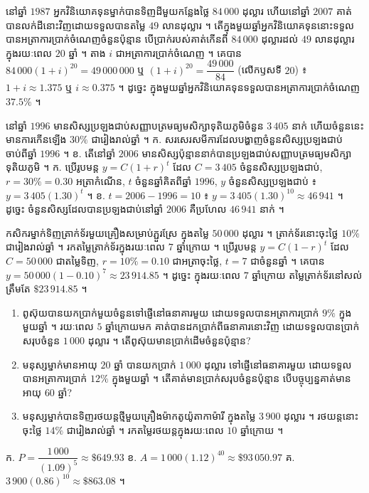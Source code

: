 \begin{example}[លំហាត់គំរូ ១]
នៅឆ្នាំ $1987$ អ្នកវិនិយោគទុនម្នាក់បានទិញដីមួយកន្លែងថ្លៃ $84\,000$ ដុល្លារ ហើយនៅឆ្នាំ $2007$ គាត់បានលក់ដីនោះវិញដោយទទួលបានតម្លៃ $49$ លានដុល្លារ ។ តើក្នុងមួយឆ្នាំអ្នកវិនិយោគទុននោះទទួលបានអត្រាការប្រាក់ចំណេញចំនួនប៉ុន្មាន បើប្រាក់របស់គាត់កើនពី $84\,000$ ដុល្លារដល់ $49$ លានដុល្លារក្នុងរយៈពេល $20$ ឆ្នាំ ។
\ans
តាង $i$ ជាអត្រាការប្រាក់ចំណេញ ។ គេបាន $84\,000(1 + i)^{20} = 49\,000\,000$ ឬ $(1 + i)^{20} = \dfrac{49\,000}{84}$ (លើកឫសទី $20$) ៖ $1 + i \approx 1.375$ ឬ $i \approx 0.375$ ។ ដូច្នេះ ក្នុងមួយឆ្នាំអ្នកវិនិយោគទុនទទួលបានអត្រាការប្រាក់ចំណេញ $37.5\%$ ។
\end{example}

\begin{example}[លំហាត់គំរូ ២]
នៅឆ្នាំ $1996$ មានសិស្សប្រឡងជាប់សញ្ញាបត្រមធ្យមសិក្សាទុតិយភូមិចំនួន $3\,405$ នាក់ ហើយចំនួននេះមានការកើនឡើង $30\%$ ជារៀងរាល់ឆ្នាំ ។ \quad ក. សរសេរសមីការដែលបង្ហាញចំនួនសិស្សប្រឡងជាប់ចាប់ពីឆ្នាំ $1996$ ។ \quad ខ. តើនៅឆ្នាំ $2006$ មានសិស្សប៉ុន្មាននាក់បានប្រឡងជាប់សញ្ញាបត្រមធ្យមសិក្សាទុតិយភូមិ ។
\ans
ក. ប្រើរូបមន្ត $y = C(1 + r)^t$ ដែល $C = 3\,405$ ចំនួនសិស្សប្រឡងជាប់, $r = 30\% = 0.30$ អត្រាកំណើន, $t$ ចំនួនឆ្នាំគិតពីឆ្នាំ $1996$, $y$ ចំនួនសិស្សប្រឡងជាប់ ៖ $y = 3\,405(1.30)^t$ ។ \quad ខ. $t = 2006 - 1996 = 10$ ៖ $y = 3\,405(1.30)^{10} \approx 46\,941$ ។ ដូច្នេះ ចំនួនសិស្សដែលបានប្រឡងជាប់នៅឆ្នាំ $2006$ គឺប្រហែល $46\,941$ នាក់ ។
\end{example}

\begin{example}[លំហាត់គំរូ ៣]
កសិករម្នាក់ទិញត្រាក់ទ័រមួយគ្រឿងសម្រាប់ភ្ជួរស្រែ ក្នុងតម្លៃ $50\,000$ ដុល្លារ ។ ត្រាក់ទ័រនោះចុះថ្លៃ $10\%$ ជារៀងរាល់ឆ្នាំ ។ រកតម្លៃត្រាក់ទ័រក្នុងរយៈពេល $7$ ឆ្នាំក្រោយ ។
\ans
ប្រើរូបមន្ត $y = C(1 - r)^t$ ដែល $C = 50\,000$ ជាតម្លៃទិញ, $r = 10\% = 0.10$ ជាអត្រាចុះថ្លៃ, $t = 7$ ជាចំនួនឆ្នាំ ។ គេបាន $y = 50\,000(1 - 0.10)^7 \approx 23\,914.85$ ។ ដូច្នេះ ក្នុងរយៈពេល $7$ ឆ្នាំក្រោយ តម្លៃត្រាក់ទ័រនៅសល់ត្រឹមតែ $\$23\,914.85$ ។
\end{example}

\begin{pro}
\begin{enumerate}[a]
  \item ពូស៊ុយបានយកប្រាក់មួយចំនួនទៅផ្ញើនៅធនាគារមួយ ដោយទទួលបានអត្រាការប្រាក់ $9\%$ ក្នុងមួយឆ្នាំ ។ រយៈពេល $5$ ឆ្នាំក្រោយមក គាត់បានដកប្រាក់ពីធនាគារនោះវិញ ដោយទទួលបានប្រាក់សរុបចំនួន $1\,000$ ដុល្លារ ។ តើពូស៊ុយមានប្រាក់ដើមចំនួនប៉ុន្មាន?
  \item មនុស្សម្នាក់មានអាយុ $20$ ឆ្នាំ បានយកប្រាក់ $1\,000$ ដុល្លារ ទៅផ្ញើនៅធនាគារមួយ ដោយទទួលបានអត្រាការប្រាក់ $12\%$ ក្នុងមួយឆ្នាំ ។ តើគាត់មានប្រាក់សរុបចំនួនប៉ុន្មាន បើបច្ចុប្បន្នគាត់មានអាយុ $60$ ឆ្នាំ?
  \item មនុស្សម្នាក់បានទិញរថយន្តថ្មីមួយគ្រឿងម៉ាកតូយ៉ូតាកាម៉ារី ក្នុងតម្លៃ $3\,900$ ដុល្លារ ។ រថយន្តនោះចុះថ្លៃ $14\%$ ជារៀងរាល់ឆ្នាំ ។ រកតម្លៃរថយន្តក្នុងរយៈពេល $10$ ឆ្នាំក្រោយ ។
\end{enumerate}
\ans
ក. $P = \dfrac{1\,000}{(1.09)^5} \approx \$649.93$ \quad ខ. $A = 1\,000(1.12)^{40} \approx \$93\,050.97$ \quad គ. $3\,900(0.86)^{10} \approx \$863.08$ ។
\end{pro}

